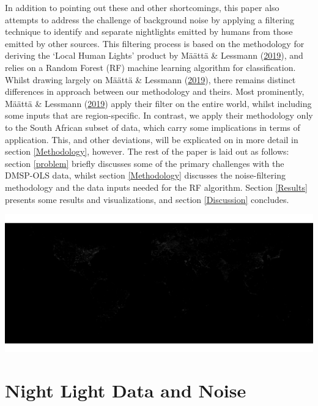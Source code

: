 \documentclass[11pt,preprint, authoryear]{elsarticle}
\let\origfigure\figure
\let\endorigfigure\endfigure
\renewenvironment{figure}[1][2] {
    \expandafter\origfigure\expandafter[H]
} {
    \endorigfigure
}
\numberwithin{equation}{section}
\numberwithin{figure}{section}
\numberwithin{table}{section}
\begin{document}
In addition to pointing out these and other shortcomings, this paper
also attempts to address the challenge of background noise by applying a
filtering technique to identify and separate nightlights emitted by
humans from those emitted by other sources. This filtering process is
based on the methodology for deriving the `Local Human Lights' product
by Määttä \& Lessmann (\protect\hyperlink{ref-maatta}{2019}), and relies
on a Random Forest (RF) machine learning algorithm for classification.
Whilst drawing largely on Määttä \& Lessmann
(\protect\hyperlink{ref-maatta}{2019}), there remains distinct
differences in approach between our methodology and theirs. Most
prominently, Määttä \& Lessmann (\protect\hyperlink{ref-maatta}{2019})
apply their filter on the entire world, whilst including some inputs
that are region-specific. In contrast, we apply their methodology only
to the South African subset of data, which carry some implications in
terms of application. This, and other deviations, will be explicated on
in more detail in section \ref{Methodology}, however. The rest of the
paper is laid out as follows: section \ref{problem} briefly discusses
some of the primary challenges with the DMSP-OLS data, whilst section
\ref{Methodology} discusses the noise-filtering methodology and the data
inputs needed for the RF algorithm. Section \ref{Results} presents some
results and visualizations, and section \ref{Discussion} concludes.

\begin{figure}[H]
\includegraphics[width=1\linewidth]{figures/stable_full} \caption{\label{stable} The Raw Stable Lights Image}\label{fig:stable}
\end{figure}

\hypertarget{night-light-data-and-noise}{%
\section{\texorpdfstring{Night Light Data and Noise
\label{problem}}{Night Light Data and Noise }}\label{night-light-data-and-noise}}
\end{document}
